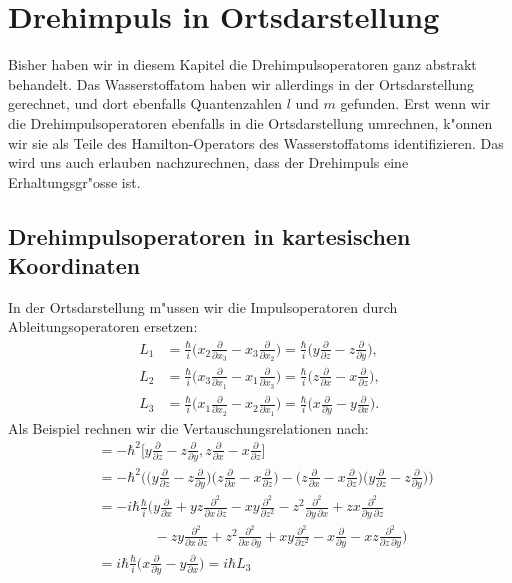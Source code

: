 \section{Drehimpuls in Ortsdarstellung\label{section:drehimpulsortsdarstellung}}
Bisher haben wir in diesem Kapitel die Drehimpulsoperatoren ganz abstrakt
behandelt. 
Das Wasserstoffatom haben wir allerdings in der Ortsdarstellung 
gerechnet, und dort ebenfalls Quantenzahlen $l$ und $m$ gefunden.
Erst wenn wir die Drehimpulsoperatoren ebenfalls in die Ortsdarstellung
umrechnen, k"onnen wir sie als Teile des Hamilton-Operators des
Wasserstoffatoms identifizieren.
Das wird uns auch erlauben nachzurechnen, dass der Drehimpuls eine
Erhaltungsgr"osse ist.

\subsection{Drehimpulsoperatoren in kartesischen Koordinaten}
In der Ortsdarstellung m"ussen wir die Impulsoperatoren durch
Ableitungsoperatoren ersetzen:
\begin{align*}
L_1
&=
\frac{\hbar}{i}\biggl(
x_2\frac{\partial}{\partial x_3}
-
x_3\frac{\partial}{\partial x_2}
\biggr)
=
\frac{\hbar}{i}\biggl(
y\frac{\partial}{\partial z}
-
z\frac{\partial}{\partial y}
\biggr),
\\
L_2
&=
\frac{\hbar}{i}
\biggl(
x_3\frac{\partial}{\partial x_1}
-
x_1\frac{\partial}{\partial x_3}
\biggr)
=
\frac{\hbar}{i}
\biggl(
z\frac{\partial}{\partial x}
-
x\frac{\partial}{\partial z}
\biggr),
\\
L_3
&=
\frac{\hbar}{i}
\biggl(
x_1\frac{\partial}{\partial x_2}
-
x_2\frac{\partial}{\partial x_1}
\biggr)
=
\frac{\hbar}{i}
\biggl(
x\frac{\partial}{\partial y}
-
y\frac{\partial}{\partial x}
\biggr).
\end{align*}
Als Beispiel rechnen wir die Vertauschungsrelationen nach:
\begin{align*}
[L_1,L_2]
&=
-\hbar^2\biggl[
y\frac{\partial}{\partial z}
-
z\frac{\partial}{\partial y},
z\frac{\partial}{\partial x}
-
x\frac{\partial}{\partial z}
\biggr]
\\
&=
-\hbar^2\biggl(
\biggl(
y\frac{\partial}{\partial z}
-
z\frac{\partial}{\partial y}
\biggr)
\biggl(
z\frac{\partial}{\partial x}
-
x\frac{\partial}{\partial z}
\biggr)
-
\biggl(
z\frac{\partial}{\partial x}
-
x\frac{\partial}{\partial z}
\biggr)
\biggl(
y\frac{\partial}{\partial z}
-
z\frac{\partial}{\partial y}
\biggr)
\biggr)
\\
&=
-i\hbar\frac{\hbar}{i}\biggl(
y\frac{\partial}{\partial x}+yz\frac{\partial^2}{\partial x\,\partial z}
-xy\frac{\partial^2}{\partial z^2}
-z^2\frac{\partial^2}{\partial y\,\partial x}
+zx\frac{\partial^2}{\partial y\,\partial z}
\\
&\qquad\qquad
-
zy\frac{\partial^2}{\partial x\,\partial z}
+z^2\frac{\partial^2}{\partial x\,\partial y}
+xy\frac{\partial^2}{\partial z^2}
-x\frac{\partial}{\partial y}-xz\frac{\partial^2}{\partial z\,\partial y}
\biggr)
\\
&=
i\hbar\frac{\hbar}{i}\biggl(
x\frac{\partial}{\partial y}-y\frac{\partial}{\partial x}
\biggr)
=i\hbar L_3
\end{align*}
